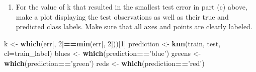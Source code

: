 \documentclass[]{article}
\newenvironment{Shaded}{\begin{snugshade}}{\end{snugshade}}
\newcommand{\DataTypeTok}[1]{\textcolor[rgb]{0.13,0.29,0.53}{#1}}
\newcommand{\DecValTok}[1]{\textcolor[rgb]{0.00,0.00,0.81}{#1}}
\newcommand{\KeywordTok}[1]{\textcolor[rgb]{0.13,0.29,0.53}{\textbf{#1}}}
\newcommand{\NormalTok}[1]{#1}
\newcommand{\OperatorTok}[1]{\textcolor[rgb]{0.81,0.36,0.00}{\textbf{#1}}}
\newcommand{\StringTok}[1]{\textcolor[rgb]{0.31,0.60,0.02}{#1}}
\providecommand{\tightlist}{%
  \setlength{\itemsep}{0pt}\setlength{\parskip}{0pt}}
\begin{document}
\begin{enumerate}
\def\labelenumi{(\alph{enumi})}
\setcounter{enumi}{3}
\tightlist
\item
  For the value of k that resulted in the smallest test error in part
  (c) above, make a plot displaying the test observations as well as
  their true and predicted class labels. Make sure that all axes and
  points are clearly labeled.
\end{enumerate}

\begin{Shaded}
\begin{Highlighting}[]
\NormalTok{k <-}\StringTok{ }\KeywordTok{which}\NormalTok{(err[, }\DecValTok{2}\NormalTok{]}\OperatorTok{==}\KeywordTok{min}\NormalTok{(err[, }\DecValTok{2}\NormalTok{]))[}\DecValTok{1}\NormalTok{]}
\NormalTok{prediction <-}\StringTok{ }\KeywordTok{knn}\NormalTok{(train, test, }\DataTypeTok{cl=}\NormalTok{train_label)}
\NormalTok{blues <-}\StringTok{ }\KeywordTok{which}\NormalTok{(prediction}\OperatorTok{==}\StringTok{'blue'}\NormalTok{)}
\NormalTok{greens <-}\StringTok{ }\KeywordTok{which}\NormalTok{(prediction}\OperatorTok{==}\StringTok{'green'}\NormalTok{)}
\NormalTok{reds <-}\StringTok{ }\KeywordTok{which}\NormalTok{(prediction}\OperatorTok{==}\StringTok{'red'}\NormalTok{)}


\end{Highlighting}
\end{Shaded}
\end{document}
